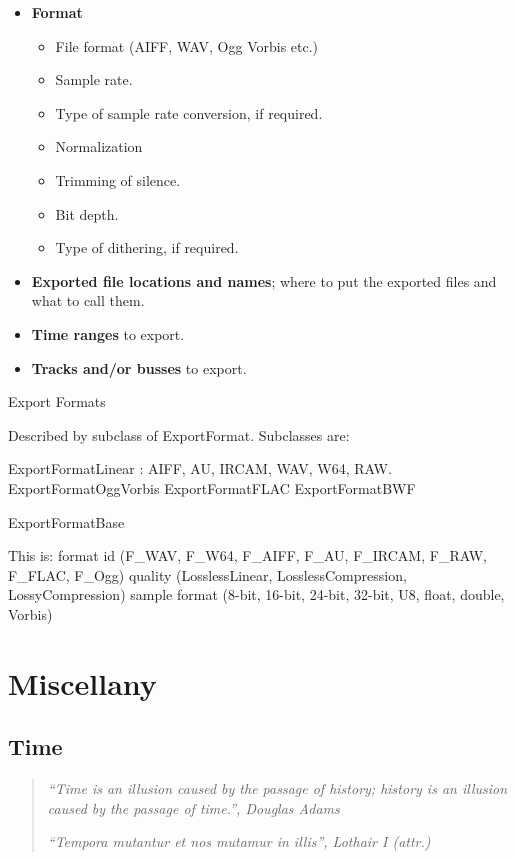 \documentclass[10pt,a4paper]{book}
\begin{document}
\begin{itemize}
\item \textbf{Format}
  \begin{itemize}
  \item File format (AIFF, WAV, Ogg Vorbis etc.)
  \item Sample rate.
  \item Type of sample rate conversion, if required.
  \item Normalization
  \item Trimming of silence.
  \item Bit depth.
  \item Type of dithering, if required.
  \end{itemize}
\item \textbf{Exported file locations and names}; where to put the exported files and what to call them.
\item \textbf{Time ranges} to export.
\item \textbf{Tracks and/or busses} to export.
\end{itemize}



Export Formats

Described by subclass of ExportFormat.  Subclasses are:

ExportFormatLinear : AIFF, AU, IRCAM, WAV, W64, RAW.
ExportFormatOggVorbis
ExportFormatFLAC
ExportFormatBWF

ExportFormatBase 

This is:
 format id (F\_WAV, F\_W64, F\_AIFF, F\_AU, F\_IRCAM, F\_RAW, F\_FLAC, F\_Ogg)
 quality (LosslessLinear, LosslessCompression, LossyCompression)
 sample format (8-bit, 16-bit, 24-bit, 32-bit, U8, float, double, Vorbis)


\chapter{Miscellany}

\section{Time}

\begin{quote}
\emph{``Time is an illusion caused by the passage of history; history is an illusion caused by the passage of time.'', Douglas Adams}

\medskip

\emph{``Tempora mutantur et nos mutamur in illis'', Lothair I (attr.)}
\end{quote}
\end{document}
